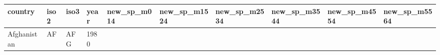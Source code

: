 \documentclass[]{article}
\begin{document}
\begin{longtable}[]{@{}llllllllll@{}}
\toprule
\begin{minipage}[b]{0.08\columnwidth}\raggedright
country\strut
\end{minipage} & \begin{minipage}[b]{0.04\columnwidth}\raggedright
iso2\strut
\end{minipage} & \begin{minipage}[b]{0.04\columnwidth}\raggedright
iso3\strut
\end{minipage} & \begin{minipage}[b]{0.04\columnwidth}\raggedright
year\strut
\end{minipage} & \begin{minipage}[b]{0.08\columnwidth}\raggedright
new\_sp\_m014\strut
\end{minipage} & \begin{minipage}[b]{0.09\columnwidth}\raggedright
new\_sp\_m1524\strut
\end{minipage} & \begin{minipage}[b]{0.09\columnwidth}\raggedright
new\_sp\_m2534\strut
\end{minipage} & \begin{minipage}[b]{0.09\columnwidth}\raggedright
new\_sp\_m3544\strut
\end{minipage} & \begin{minipage}[b]{0.09\columnwidth}\raggedright
new\_sp\_m4554\strut
\end{minipage} & \begin{minipage}[b]{0.09\columnwidth}\raggedright
new\_sp\_m5564\strut
\end{minipage}\tabularnewline
\midrule
\endhead
\begin{minipage}[t]{0.08\columnwidth}\raggedright
Afghanistan\strut
\end{minipage} & \begin{minipage}[t]{0.04\columnwidth}\raggedright
AF\strut
\end{minipage} & \begin{minipage}[t]{0.04\columnwidth}\raggedright
AFG\strut
\end{minipage} & \begin{minipage}[t]{0.04\columnwidth}\raggedright
1980\strut
\end{minipage} & \begin{minipage}[t]{0.08\columnwidth}\raggedright
\strut
\end{minipage} & \begin{minipage}[t]{0.09\columnwidth}\raggedright

\end{minipage}
\end{longtable}
\end{document}
